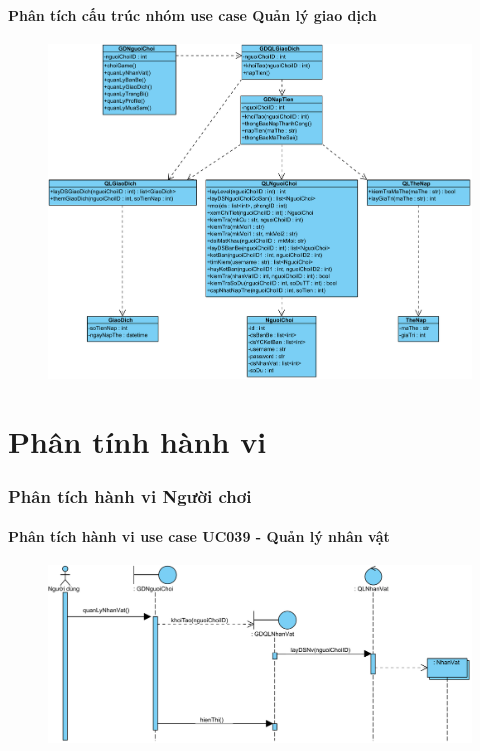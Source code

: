 \documentclass[3p]{elsarticle}
\begin{document}
\subsection{Phân tích cấu trúc nhóm use case Quản lý giao dịch}
\begin{figure}[!htbp]
	\hspace*{-.5in}
	\centering
	\includegraphics[scale=.55]{images/structure-pdfs/gamer/TransactionManagement.pdf}
\end{figure}
\newpage
\part{Phân tính hành vi}
\section{Phân tích hành vi Người chơi}



\subsection{Phân tích hành vi use case UC039 - Quản lý nhân vật}
\begin{figure}[!htbp]
	\hspace*{-.5in}
	\centering
	\includegraphics[scale=.55]{images/sequence-pdfs/gamer/CharacterManagement.pdf}
\end{figure}
\end{document}
